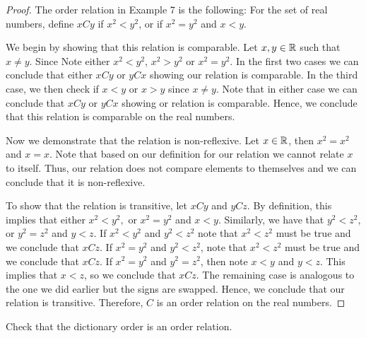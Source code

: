 \documentclass[12pt]{article}
\begin{document}
\begin{proof}
	The order relation in Example 7 is the following: For the set of real numbers, define $xCy$
	if $x^2 < y^2$, or if $x^2 = y^2$ and $x < y$.
	
	We begin by showing that this relation is comparable. Let $x, y \in \mathbb{R}$ such that 
	$x \neq y$. Since Note either $x^2 < y^2$, $x^2 > y^2$ or $x^2 = y^2$. In the first
	two cases we can conclude that either $xCy$ or $yCx$ showing our relation is comparable. In
	the third case, we then check if $x < y$ or $x > y$ since $x \neq y$. Note that in either case
	we can conclude that $xCy$ or $yCx$ showing or relation is comparable. Hence, we conclude
	that this relation is comparable on the real numbers.
	
	Now we demonstrate that the relation is non-reflexive. Let $x \in \mathbb{R}$, then $x^2 = x^2$ and 
	$x = x$. Note that based on our definition for our relation we cannot relate $x$ to itself. Thus,
	our relation does not compare elements to themselves and we can conclude that it is non-reflexive.
	
	To show that the relation is transitive, let $xCy$ and $yCz$. By definition,
	this implies that either $x^2 < y^2,$ or $x^2 = y^2$ and $x < y$. Similarly, we have that 
	$y^2 < z^2$, or $y^2 = z^2$ and $y < z$. If $x^2 < y^2$ and $y^2 < z^2$ note that $x^2 < z^2$
	must be true and we conclude that $xCz$. If $x^2 = y^2$ and $y^2 < z^2$, note that
	$x^2 < z^2$ must be true and we conclude that $xCz$. If $x^2 = y^2$ and $y^2 = z^2$, then note
	$x < y$ and $y < z$. This implies that $x < z$, so we conclude that $xCz$. The remaining case 
	is analogous to the one we did earlier but the signs are swapped. Hence, we conclude that
	our relation is transitive. Therefore, $C$ is an order relation on the real numbers.
\end{proof}

 Check that the dictionary order is an order relation. 
\end{document}
